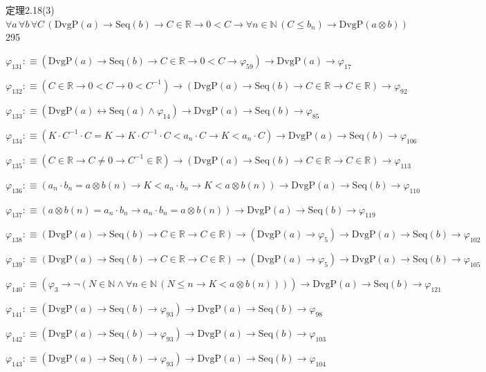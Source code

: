 \begin{fullproof}{定理2.18(3)}{$\forall a\,\forall b\,\forall C\,(\mathrm{DvgP}(a) \to \mathrm{Seq}(b) \to C \in \mathbb{R} \to 0 < C \to \forall n \in \mathbb{N}\,(C \leq b_{n}) \to \mathrm{DvgP}(a \otimes b))$}{295}
\begin{abbrevlist}
\item $\varphi_{131} :\equiv (\mathrm{DvgP}(a) \to \mathrm{Seq}(b) \to C \in \mathbb{R} \to 0 < C \to \varphi_{59}) \to \mathrm{DvgP}(a) \to \varphi_{17}$
\item $\varphi_{132} :\equiv (C \in \mathbb{R} \to 0 < C \to 0 < C^{-1}) \to (\mathrm{DvgP}(a) \to \mathrm{Seq}(b) \to C \in \mathbb{R} \to C \in \mathbb{R}) \to \varphi_{92}$
\item $\varphi_{133} :\equiv (\mathrm{DvgP}(a) \leftrightarrow \mathrm{Seq}(a) \land \varphi_{14}) \to \mathrm{DvgP}(a) \to \mathrm{Seq}(b) \to \varphi_{85}$
\item $\varphi_{134} :\equiv (K \cdot C^{-1} \cdot C = K \to K \cdot C^{-1} \cdot C < a_{n} \cdot C \to K < a_{n} \cdot C) \to \mathrm{DvgP}(a) \to \mathrm{Seq}(b) \to \varphi_{106}$
\item $\varphi_{135} :\equiv (C \in \mathbb{R} \to C \neq 0 \to C^{-1} \in \mathbb{R}) \to (\mathrm{DvgP}(a) \to \mathrm{Seq}(b) \to C \in \mathbb{R} \to C \in \mathbb{R}) \to \varphi_{113}$
\item $\varphi_{136} :\equiv (a_{n} \cdot b_{n} = a \otimes b(n) \to K < a_{n} \cdot b_{n} \to K < a \otimes b(n)) \to \mathrm{DvgP}(a) \to \mathrm{Seq}(b) \to \varphi_{110}$
\item $\varphi_{137} :\equiv (a \otimes b(n) = a_{n} \cdot b_{n} \to a_{n} \cdot b_{n} = a \otimes b(n)) \to \mathrm{DvgP}(a) \to \mathrm{Seq}(b) \to \varphi_{119}$
\item $\varphi_{138} :\equiv (\mathrm{DvgP}(a) \to \mathrm{Seq}(b) \to C \in \mathbb{R} \to C \in \mathbb{R}) \to (\mathrm{DvgP}(a) \to \varphi_{5}) \to \mathrm{DvgP}(a) \to \mathrm{Seq}(b) \to \varphi_{102}$
\item $\varphi_{139} :\equiv (\mathrm{DvgP}(a) \to \mathrm{Seq}(b) \to C \in \mathbb{R} \to C \in \mathbb{R}) \to (\mathrm{DvgP}(a) \to \varphi_{5}) \to \mathrm{DvgP}(a) \to \mathrm{Seq}(b) \to \varphi_{105}$
\item $\varphi_{140} :\equiv (\varphi_{3} \to \neg (N \in \mathbb{N} \land \forall n \in \mathbb{N}\,(N \leq n \to K < a \otimes b(n)))) \to \mathrm{DvgP}(a) \to \mathrm{Seq}(b) \to \varphi_{121}$
\item $\varphi_{141} :\equiv (\mathrm{DvgP}(a) \to \mathrm{Seq}(b) \to \varphi_{93}) \to \mathrm{DvgP}(a) \to \mathrm{Seq}(b) \to \varphi_{98}$
\item $\varphi_{142} :\equiv (\mathrm{DvgP}(a) \to \mathrm{Seq}(b) \to \varphi_{93}) \to \mathrm{DvgP}(a) \to \mathrm{Seq}(b) \to \varphi_{103}$
\item $\varphi_{143} :\equiv (\mathrm{DvgP}(a) \to \mathrm{Seq}(b) \to \varphi_{93}) \to \mathrm{DvgP}(a) \to \mathrm{Seq}(b) \to \varphi_{104}$

\end{abbrevlist}
\end{fullproof}
